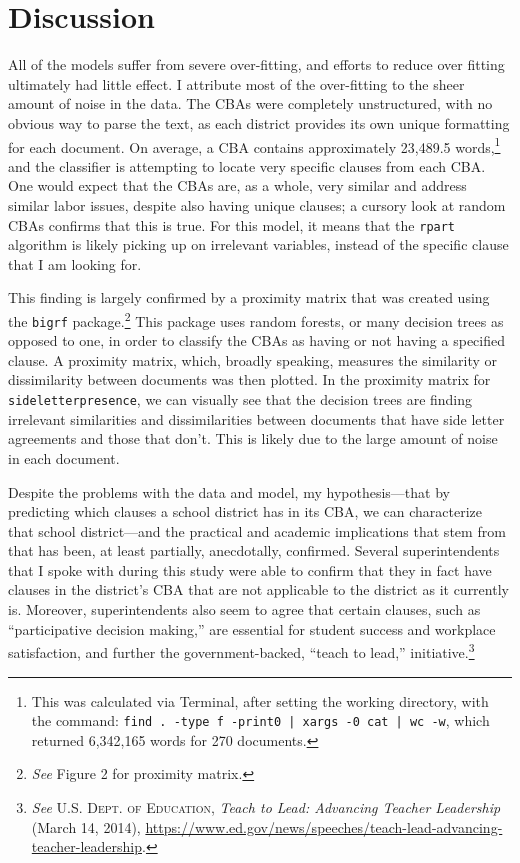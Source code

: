 \section{Discussion}

All of the models suffer from severe over-fitting, and efforts to reduce over fitting ultimately had little effect. I attribute most of the over-fitting to the sheer amount of noise in the data. The CBAs were completely unstructured, with no obvious way to parse the text, as each district provides its own unique formatting for each document. On average, a CBA contains approximately 23,489.5 words,\footnote{\hspace{2ex}This was calculated via Terminal, after setting the working directory, with the command: \texttt{find . -type f -print0 | xargs -0 cat | wc -w}, which returned 6,342,165 words for 270 documents.} and the  classifier is attempting to locate very specific clauses from each CBA. One would expect that the CBAs are, as a whole, very similar and address similar labor issues, despite also having unique clauses; a cursory look at random CBAs confirms that this is true. For this model, it means that the \texttt{rpart} algorithm is likely picking up on irrelevant variables, instead of the specific clause that I am looking for. 

This finding is largely confirmed by a proximity matrix that was created using the \texttt{bigrf} package.\footnote{\hspace{2ex}\textit{See} Figure 2 for proximity matrix.} This package uses random forests, or many decision trees as opposed to one, in order to classify the CBAs as having or not having a specified clause. A proximity matrix, which, broadly speaking, measures the similarity or dissimilarity between documents was then plotted. In the proximity matrix for \texttt{sideletterpresence}, we can visually see that the decision trees are finding irrelevant similarities and dissimilarities between documents that have side letter agreements and those that don’t. This is likely due to the large amount of noise in each document. 

Despite the problems with the data and model, my hypothesis---that by predicting which clauses a school district has in its CBA, we can characterize that school district---and the practical and academic implications that stem from that has been, at least partially, anecdotally, confirmed. Several superintendents that I spoke with during this study were able to confirm that they in fact have clauses in the district’s CBA that are not applicable to the district as it currently is. Moreover, superintendents also seem to agree that certain clauses, such as “participative decision making,” are essential for student success and workplace satisfaction, and further the government-backed, “teach to lead,” initiative.\footnote{\hspace{2ex}\textit{See} \textsc{U.S. Dept. of Education}, \textit{Teach to Lead: Advancing Teacher Leadership} (March 14, 2014), \url{https://www.ed.gov/news/speeches/teach-lead-advancing-teacher-leadership}.} 

